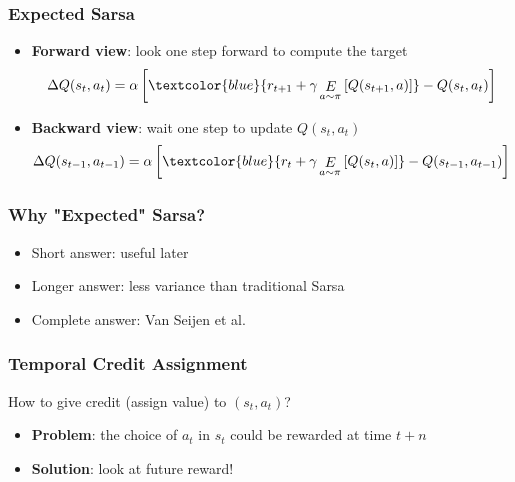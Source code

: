\documentclass{beamer}
\newcommand{\expect}[2]{\mathop{E}_{#1}\left[#2\right]}
\begin{document}
\begin{frame}
\frametitle{Expected Sarsa}
\begin{itemize}
\item<1-> \textbf{Forward view}: look one step forward to compute the target
\[
	\Delta Q(s_t,a_t) = \alpha\left[\textcolor{blue}{r_{t+1} + \gamma\expect{a\sim\pi}{Q(s_{t+1},a)}} - Q(s_t,a_t)\right]
\]
\item<2-> \textbf{Backward view}: wait one step to update $Q(s_t,a_t)$
\begin{align*}
	\Delta Q(s_{t-1},a_{t-1}) = \alpha\left[
	\textcolor{blue}{r_t + \gamma\expect{a\sim\pi}{Q(s_t,a)}} - Q(s_{t-1},a_{t-1})\right] 
\end{align*}
\end{itemize}
\end{frame}

\begin{frame}
\frametitle{Why "Expected" Sarsa?}
\begin{itemize}
\item Short answer: useful later
\item Longer answer: less variance than traditional Sarsa
\item Complete answer: Van Seijen et al. \cite{van2009theoretical}
\end{itemize}
\end{frame}

\begin{frame}
\frametitle{Temporal Credit Assignment}
How to give credit (assign value) to $(s_t,a_t)$?

\begin{itemize}
\item<1->
\textbf{Problem}: the choice of $a_t$ in $s_t$ could be rewarded at time $t+n$
\item<2->\textbf{Solution}: look at future reward!
\end{itemize}
\end{frame}
\end{document}
